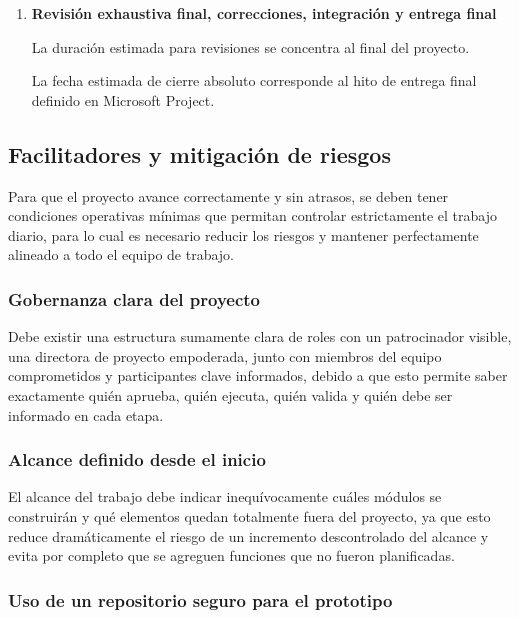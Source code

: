 \documentclass[11pt,spanish]{article}
\begin{document}
\begin{enumerate}
    La duración estimada final corresponde a la fase de cierre del proyecto.

    La fecha estimada de entrega preliminar se establece antes del hito final del cronograma.

    \item \textbf{Revisión exhaustiva final, correcciones, integración y entrega final}

    La duración estimada para revisiones se concentra al final del proyecto.

    La fecha estimada de cierre absoluto corresponde al hito de entrega final definido en Microsoft Project.
\end{enumerate}

\subsection{Facilitadores y mitigación de riesgos}

Para que el proyecto avance correctamente y sin atrasos, se deben tener condiciones operativas mínimas que permitan controlar estrictamente el trabajo diario, para lo cual es necesario reducir los riesgos y mantener perfectamente alineado a todo el equipo de trabajo.

\subsubsection{Gobernanza clara del proyecto}

Debe existir una estructura sumamente clara de roles con un patrocinador visible, una directora de proyecto empoderada, junto con miembros del equipo comprometidos y participantes clave informados, debido a que esto permite saber exactamente quién aprueba, quién ejecuta, quién valida y quién debe ser informado en cada etapa.

\subsubsection{Alcance definido desde el inicio}

El alcance del trabajo debe indicar inequívocamente cuáles módulos se construirán y qué elementos quedan totalmente fuera del proyecto, ya que esto reduce dramáticamente el riesgo de un incremento descontrolado del alcance y evita por completo que se agreguen funciones que no fueron planificadas.

\subsubsection{Uso de un repositorio seguro para el prototipo}
\end{document}
